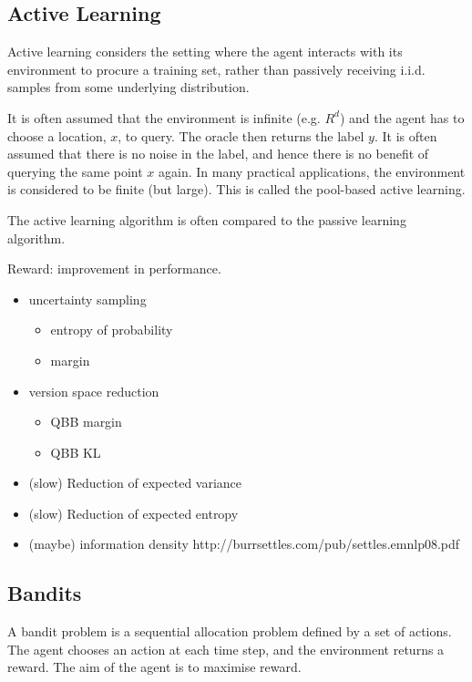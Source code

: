 \documentclass[fleqn,10pt,lineno]{wlpeerj} %
\begin{document}
\subsection*{Active Learning}

Active learning considers the setting where the agent interacts with
its environment to procure a training set, rather than passively
receiving i.i.d. samples from some underlying distribution.

It is often assumed that the environment is infinite (e.g. $R^d$) and
the agent has to choose a location, $x$, to query. The oracle then returns
the label $y$. It is often assumed that there is no noise in the label,
and hence there is no benefit of querying the same point $x$ again. In
many practical applications, the environment is considered to be
finite (but large). This is called the pool-based active learning.

The active learning algorithm is often compared to the passive
learning algorithm.

Reward: improvement in performance.

\begin{itemize}
  \item uncertainty sampling
    \begin{itemize}
      \item entropy of probability
      \item margin
    \end{itemize}
  \item version space reduction
    \begin{itemize}
      \item QBB margin
      \item QBB KL
    \end{itemize}
  \item (slow) Reduction of expected variance
  \item (slow) Reduction of expected entropy
  \item (maybe) information density http://burrsettles.com/pub/settles.emnlp08.pdf
\end{itemize}

\subsection*{Bandits}

A bandit problem is a sequential allocation problem defined by a set
of actions. The agent chooses an action at each time step, and the
environment returns a reward. The aim of the agent is to maximise reward.
\end{document}
